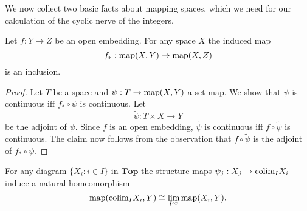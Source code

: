 We now collect two basic facts about mapping spaces, which we need for
our calculation of the cyclic nerve of the integers.
\begin{lem}\label{lem:mapinclusion}
Let $f:Y\to Z$ be an open embedding. For any space $X$ the induced map
$$f_\ast:\mathrm{map}(X,Y)\to \mathrm{map}(X,Z)$$
is an inclusion.
\end{lem}

\begin{proof}
Let $T$ be a space and $\psi:T\rightarrow \mathrm{map}(X,Y)$ a set map.
We show that $\psi$ is continuous iff $f_\ast\circ\psi$ is continuous.
Let $$\tilde \psi:T\times X\rightarrow Y$$
be the adjoint of $\psi$. Since $f$ is an open embedding, $\tilde \psi$
is continuous iff $f\circ \tilde\psi$ is continuous. The claim now follows
from the observation that $f\circ \tilde\psi$ is the adjoint of
$f_\ast\circ\psi$.
\end{proof}

\begin{lem}\label{lem:maprepresentable}
For any diagram $\{X_i:i\in I\}$ in $\mathbf{Top}$
the structure maps $\psi_j: X_j\to \mathrm{colim}_I X_i$  induce a natural homeomorphism
\[ \mathrm{map}(\mathrm{colim}_I X_i, Y)\cong \lim_{I^{\mathrm{op}}} \mathrm{map}(X_i, Y).
\]
\end{lem}

